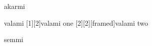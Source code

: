 
\newpage
{}

\begin{NewFig}{akarmi}
\caption{akarmi}
\end{NewFig}

\newpage
{}

\begin{NewFig}{valami}
%
	[1][2]{valami one}
	[2][2][framed]{valami two}
\caption{valami}
\end{NewFig}

\hrulefill
\begin{NewFig}[2cm]{semmi}
\hrulefill
\end{NewFig}
